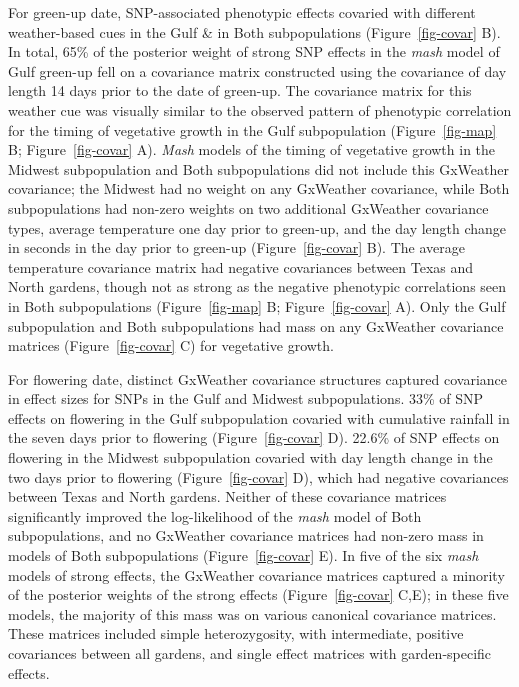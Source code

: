 \documentclass[
  9pt,
  twocolumn,
  twoside]{pnas-new}
\begin{document}
For green-up date, SNP-associated phenotypic effects covaried with
different weather-based cues in the Gulf \& in Both subpopulations
(Figure~\ref{fig-covar} B). In total, 65\% of the posterior weight of
strong SNP effects in the \emph{mash} model of Gulf green-up fell on a
covariance matrix constructed using the covariance of day length 14 days
prior to the date of green-up. The covariance matrix for this weather
cue was visually similar to the observed pattern of phenotypic
correlation for the timing of vegetative growth in the Gulf
subpopulation (Figure~\ref{fig-map} B; Figure~\ref{fig-covar} A).
\emph{Mash} models of the timing of vegetative growth in the Midwest
subpopulation and Both subpopulations did not include this GxWeather
covariance; the Midwest had no weight on any GxWeather covariance, while
Both subpopulations had non-zero weights on two additional GxWeather
covariance types, average temperature one day prior to green-up, and the
day length change in seconds in the day prior to green-up
(Figure~\ref{fig-covar} B). The average temperature covariance matrix
had negative covariances between Texas and North gardens, though not as
strong as the negative phenotypic correlations seen in Both
subpopulations (Figure~\ref{fig-map} B; Figure~\ref{fig-covar} A). Only
the Gulf subpopulation and Both subpopulations had mass on any GxWeather
covariance matrices (Figure~\ref{fig-covar} C) for vegetative growth.

For flowering date, distinct GxWeather covariance structures captured
covariance in effect sizes for SNPs in the Gulf and Midwest
subpopulations. 33\% of SNP effects on flowering in the Gulf
subpopulation covaried with cumulative rainfall in the seven days prior
to flowering (Figure~\ref{fig-covar} D). 22.6\% of SNP effects on
flowering in the Midwest subpopulation covaried with day length change
in the two days prior to flowering (Figure~\ref{fig-covar} D), which had
negative covariances between Texas and North gardens. Neither of these
covariance matrices significantly improved the log-likelihood of the
\emph{mash} model of Both subpopulations, and no GxWeather covariance
matrices had non-zero mass in models of Both subpopulations
(Figure~\ref{fig-covar} E). In five of the six \emph{mash} models of
strong effects, the GxWeather covariance matrices captured a minority of
the posterior weights of the strong effects (Figure~\ref{fig-covar}
C,E); in these five models, the majority of this mass was on various
canonical covariance matrices. These matrices included simple
heterozygosity, with intermediate, positive covariances between all
gardens, and single effect matrices with garden-specific effects.
\end{document}
